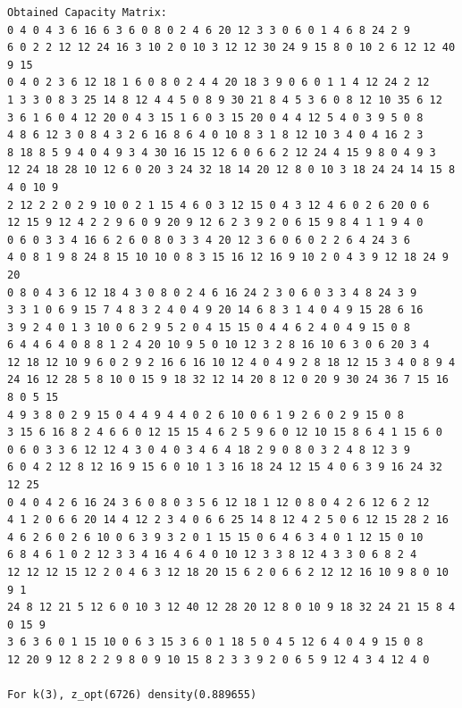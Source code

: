 \documentclass[11pt]{article}
\begin{document}
\begin{lstlisting}
Obtained Capacity Matrix:
0 4 0 4 3 6 16 6 3 6 0 8 0 2 4 6 20 12 3 3 0 6 0 1 4 6 8 24 2 9
6 0 2 2 12 12 24 16 3 10 2 0 10 3 12 12 30 24 9 15 8 0 10 2 6 12 12 40 9 15
0 4 0 2 3 6 12 18 1 6 0 8 0 2 4 4 20 18 3 9 0 6 0 1 1 4 12 24 2 12
1 3 3 0 8 3 25 14 8 12 4 4 5 0 8 9 30 21 8 4 5 3 6 0 8 12 10 35 6 12
3 6 1 6 0 4 12 20 0 4 3 15 1 6 0 3 15 20 0 4 4 12 5 4 0 3 9 5 0 8
4 8 6 12 3 0 8 4 3 2 6 16 8 6 4 0 10 8 3 1 8 12 10 3 4 0 4 16 2 3
8 18 8 5 9 4 0 4 9 3 4 30 16 15 12 6 0 6 6 2 12 24 4 15 9 8 0 4 9 3
12 24 18 28 10 12 6 0 20 3 24 32 18 14 20 12 8 0 10 3 18 24 24 14 15 8 4 0 10 9
2 12 2 2 0 2 9 10 0 2 1 15 4 6 0 3 12 15 0 4 3 12 4 6 0 2 6 20 0 6
12 15 9 12 4 2 2 9 6 0 9 20 9 12 6 2 3 9 2 0 6 15 9 8 4 1 1 9 4 0
0 6 0 3 3 4 16 6 2 6 0 8 0 3 3 4 20 12 3 6 0 6 0 2 2 6 4 24 3 6
4 0 8 1 9 8 24 8 15 10 10 0 8 3 15 16 12 16 9 10 2 0 4 3 9 12 18 24 9 20
0 8 0 4 3 6 12 18 4 3 0 8 0 2 4 6 16 24 2 3 0 6 0 3 3 4 8 24 3 9
3 3 1 0 6 9 15 7 4 8 3 2 4 0 4 9 20 14 6 8 3 1 4 0 4 9 15 28 6 16
3 9 2 4 0 1 3 10 0 6 2 9 5 2 0 4 15 15 0 4 4 6 2 4 0 4 9 15 0 8
6 4 4 6 4 0 8 8 1 2 4 20 10 9 5 0 10 12 3 2 8 16 10 6 3 0 6 20 3 4
12 18 12 10 9 6 0 2 9 2 16 6 16 10 12 4 0 4 9 2 8 18 12 15 3 4 0 8 9 4
24 16 12 28 5 8 10 0 15 9 18 32 12 14 20 8 12 0 20 9 30 24 36 7 15 16 8 0 5 15
4 9 3 8 0 2 9 15 0 4 4 9 4 4 0 2 6 10 0 6 1 9 2 6 0 2 9 15 0 8
3 15 6 16 8 2 4 6 6 0 12 15 15 4 6 2 5 9 6 0 12 10 15 8 6 4 1 15 6 0
0 6 0 3 3 6 12 12 4 3 0 4 0 3 4 6 4 18 2 9 0 8 0 3 2 4 8 12 3 9
6 0 4 2 12 8 12 16 9 15 6 0 10 1 3 16 18 24 12 15 4 0 6 3 9 16 24 32 12 25
0 4 0 4 2 6 16 24 3 6 0 8 0 3 5 6 12 18 1 12 0 8 0 4 2 6 12 6 2 12
4 1 2 0 6 6 20 14 4 12 2 3 4 0 6 6 25 14 8 12 4 2 5 0 6 12 15 28 2 16
4 6 2 6 0 2 6 10 0 6 3 9 3 2 0 1 15 15 0 6 4 6 3 4 0 1 12 15 0 10
6 8 4 6 1 0 2 12 3 3 4 16 4 6 4 0 10 12 3 3 8 12 4 3 3 0 6 8 2 4
12 12 12 15 12 2 0 4 6 3 12 18 20 15 6 2 0 6 6 2 12 12 16 10 9 8 0 10 9 1
24 8 12 21 5 12 6 0 10 3 12 40 12 28 20 12 8 0 10 9 18 32 24 21 15 8 4 0 15 9
3 6 3 6 0 1 15 10 0 6 3 15 3 6 0 1 18 5 0 4 5 12 6 4 0 4 9 15 0 8
12 20 9 12 8 2 2 9 8 0 9 10 15 8 2 3 3 9 2 0 6 5 9 12 4 3 4 12 4 0

For k(3), z_opt(6726) density(0.889655)


\end{lstlisting}
\end{document}
